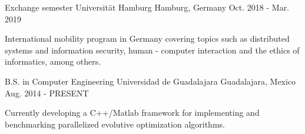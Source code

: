 \begin{cventries}
    \cventry
        {Exchange semester}
        {Universität Hamburg}
        {Hamburg, Germany}
        {Oct. 2018 - Mar. 2019}
        {
            \begin{cvitems}
                \item {International mobility program in Germany covering topics such as distributed systems and information security, human - computer interaction and the ethics of informatics, among others.}
            \end{cvitems}
        }
    \cventry
        {B.S. in Computer Engineering}
        {Universidad de Guadalajara}
        {Guadalajara, Mexico}
        {Aug. 2014 - PRESENT}
        {
            \begin{cvitems}
                \item {Currently developing a C++/Matlab framework for implementing and benchmarking parallelized evolutive optimization algorithms.}
            \end{cvitems}
        }
\end{cventries}

